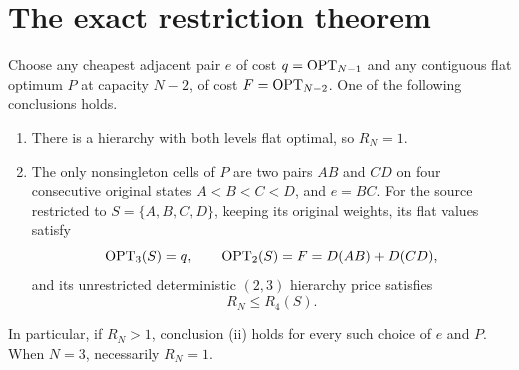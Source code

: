 \section{The exact restriction theorem}


\begin{theorem}
\label{thm:reduction}
Choose any cheapest adjacent pair $e$ of cost $q=\operatorname{OPT}_{N-1}$ and any
contiguous flat optimum $P$ at capacity $N-2$, of cost $F=\operatorname{OPT}_{N-2}$.
One of the following conclusions holds.
\begin{enumerate}[label=\textup{(\roman*)}]
\item There is a hierarchy with both levels flat optimal, so $R_N=1$.
\item The only nonsingleton cells of $P$ are two pairs $AB$ and $CD$ on
four consecutive original states $A<B<C<D$, and $e=BC$. For the source
restricted to $S=\{A,B,C,D\}$, keeping its original weights, its flat
values satisfy
\[
 \operatorname{OPT}_3(S)=q,\qquad \operatorname{OPT}_2(S)=F=D(AB)+D(CD),
\]
and its unrestricted deterministic $(2,3)$ hierarchy price satisfies
\[
 R_N\le R_4(S).
\]
\end{enumerate}
In particular, if $R_N>1$, conclusion \textup{(ii)} holds for every such
choice of $e$ and $P$. When $N=3$, necessarily $R_N=1$.
\end{theorem}

